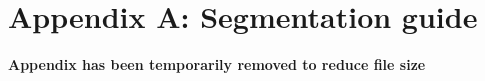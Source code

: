 \appendix

\chapter{Appendix A: Segmentation guide}\label{a:guide}
%
\textbf{Appendix has been temporarily removed to reduce file size}




% 


% 

% 
